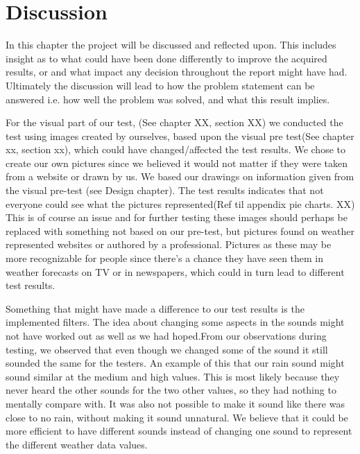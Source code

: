 
\section{Discussion} %
\label{sec:discussion}

In this chapter the project will be discussed and reflected upon. 
This includes insight as to what could have been done differently to improve the acquired results, or and what impact any decision throughout the report might have had. 
Ultimately the discussion will lead to how the problem statement can be answered i.e. how well the problem was solved, and what this result implies.

For the visual part of our test, (See chapter XX, section XX) we conducted the test using images created by ourselves, based upon the visual pre test(See chapter xx, section xx), which could have changed/affected the test results. We chose to create our own pictures since we believed it would not matter if they were taken from a website or drawn by us. We based our drawings on information given from the visual pre-test (see Design chapter). The test results indicates that not everyone could see what the pictures represented(Ref til appendix pie charts. XX) This is of course an issue and for further testing these images should perhaps be replaced with something not based on our pre-test, but pictures found on weather represented websites or authored by a professional. Pictures as these may be more recognizable for people since there’s a chance they have seen them in weather forecasts on TV or in newspapers, which could in turn lead to different test results.


Something that might have made a difference to our test results is the implemented filters. The idea about changing some aspects in the sounds might not have worked out as well as we had hoped.From our observations during testing, we observed that even though we changed some of the sound it still sounded the same for the testers. An example of this that our rain sound might sound similar at the medium and high values. This is most likely because they never heard the other sounds for the two other values, so they had nothing to mentally compare with. It was also not possible to make it sound like there was close to no rain, without making it sound unnatural. We believe that it could be more efficient to have different sounds instead of changing one sound to represent the different weather data values.


